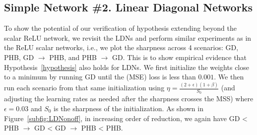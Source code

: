 \subsection{Simple Network \#2. Linear Diagonal Networks}
\label{sec:ldn-hypothesis}


To show the potential of our verification of hypothesis extending beyond the scalar ReLU network, we revisit the LDNs and perform similar experiments as in the ReLU scalar networks, i.e., we plot the sharpness across 4 scenarios: {\color{blue} GD}, {\color{orange} PHB}, {\color{darkgreen} GD $\to$ PHB}, and {\color{red} PHB $\to$ GD}.
This is to show empirical evidence that Hypothesis~\ref{hypothesis} also holds for LDNs.
We first initialize the weights close to a minimum by running GD until the (MSE) loss is less than $0.001$.
We then run each scenario from that same initialization using $\eta = \frac{(2+\epsilon)(1+\beta)}{S_0}$ (and adjusting the learning rates as needed after the sharpness crosses the MSS) where $\epsilon = 0.03$ and $S_0$ is the sharpness of the initialization. As shown in Figure~\ref{subfig:LDNonoff}, in increasing order of reduction, we again have {\color{blue} GD} < {\color{red} PHB $\to$ GD} < {\color{darkgreen} GD $\to$ PHB} < {\color{orange} PHB}.

